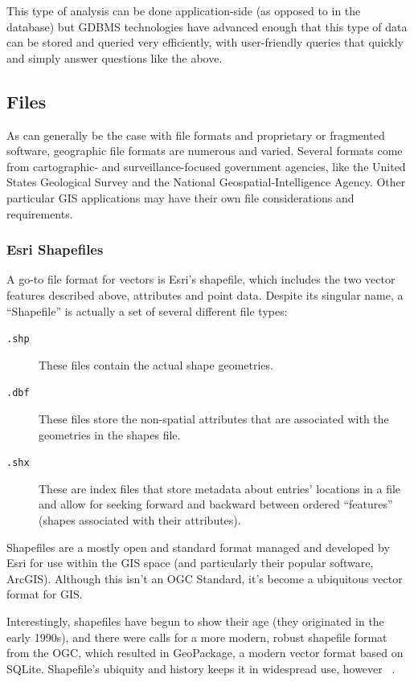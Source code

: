 This type of analysis can be done application-side (as opposed to in the database) but GDBMS technologies have advanced enough that this type of data can be stored and queried very efficiently, with user-friendly queries that quickly and simply answer questions like the above.

\subsection{Files}
\label{background_formats}
As can generally be the case with file formats and proprietary or fragmented software, geographic file formats are numerous and varied. Several formats come from cartographic- and surveillance-focused government agencies, like the United States Geological Survey and the National Geospatial-Intelligence Agency. Other particular GIS applications may have their own file considerations and requirements.

\subsubsection{Esri Shapefiles}
A go-to file format for vectors is Esri's shapefile, which includes the two vector features described above, attributes and point data. Despite its singular name, a ``Shapefile'' is actually a set of several different file types:

\begin{description}
  \item[\tt{.shp}] These files contain the actual shape geometries.
  \item[\tt{.dbf}] These files store the non-spatial attributes that are associated with the geometries in the shapes file.
  \item[\tt{.shx}] These are index files that store metadata about entries' locations in a file and allow for seeking forward and backward between ordered ``features'' (shapes associated with their attributes).
\end{description}

Shapefiles are a mostly open and standard format managed and developed by Esri for use within the GIS space (and particularly their popular software, ArcGIS). Although this isn't an OGC Standard, it's become a ubiquitous vector format for GIS.

Interestingly, shapefiles have begun to show their age (they originated in the early 1990s), and there were calls for a more modern, robust shapefile format from the OGC, which resulted in GeoPackage, a modern vector format based on SQLite. Shapefile's ubiquity and history keeps it in widespread use, however ~\cite{slashgeo,GeoPackage}.

